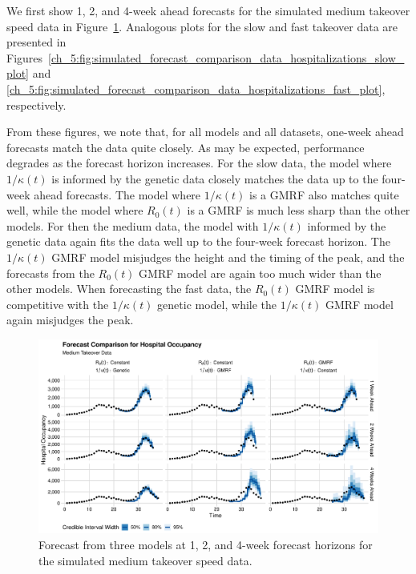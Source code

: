 We first show 1, 2, and 4-week ahead forecasts for the simulated medium takeover speed data in Figure~\ref{ch_5:fig:simulated_forecast_comparison_data_hospitalizations_medium_plot}.
Analogous plots for the slow and fast takeover data are presented in Figures~\ref{ch_5:fig:simulated_forecast_comparison_data_hospitalizations_slow_plot} and \ref{ch_5:fig:simulated_forecast_comparison_data_hospitalizations_fast_plot}, respectively.

From these figures, we note that, for all models and all datasets, one-week ahead forecasts match the data quite closely.
As may be expected, performance degrades as the forecast horizon increases.
For the slow data, the model where \( 1 / \kappa(t) \) is informed by the genetic data closely matches the data up to the four-week ahead forecasts.
The model where \( 1 / \kappa(t) \) is a GMRF also matches quite well, while the model where \( R_0(t) \) is a GMRF is much less sharp than the other models.
For then the medium data, the model with \( 1 / \kappa(t) \) informed by the genetic data again fits the data well up to the four-week forecast horizon.
The \( 1 / \kappa(t) \) GMRF model misjudges the height and the timing of the peak, and the forecasts from the \( R_0(t) \) GMRF model are again too much wider than the other models.
When forecasting the fast data, the \( R_0(t) \) GMRF model is competitive with the \( 1 / \kappa(t) \) genetic model, while the \( 1 / \kappa(t) \) GMRF model again misjudges the peak.

\begin{figure}
    \centering
    \includegraphics[width=1.0\columnwidth]{simulated_forecast_comparison_data_hospitalizations_medium_plot}
    \caption{Forecast from three models at 1, 2, and 4-week forecast horizons for the simulated medium takeover speed data.}
    \label{ch_5:fig:simulated_forecast_comparison_data_hospitalizations_medium_plot}
\end{figure}

